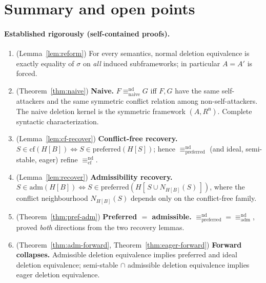 \documentclass{amsart}
\theoremstyle{remark}
\begin{document}
\section{Summary and open points}\label{sec:status}

\paragraph{Established rigorously (self-contained proofs).}
\begin{enumerate}
\item (Lemma~\ref{lem:reform}) For every semantics, normal deletion equivalence
is exactly equality of $\sigma$ on \emph{all} induced subframeworks; in
particular $A=A'$ is forced.
\item (Theorem~\ref{thm:naive}) \textbf{Naive.} $F\equiv^{\mathrm{nd}}_
{\mathrm{naive}}G$ iff $F,G$ have the same self-attackers and the same symmetric
conflict relation among non-self-attackers.  The naive deletion kernel is the
symmetric framework $(A,R^{\mathrm n})$.  Complete syntactic characterization.
\item (Lemma~\ref{lem:cf-recover}) \textbf{Conflict-free recovery.}
$S\in\mathrm{cf}(H[B])\iff S\in\mathrm{preferred}(H[S])$; hence
$\equiv^{\mathrm{nd}}_{\mathrm{preferred}}$ (and ideal, semi-stable, eager)
refine $\equiv^{\mathrm{nd}}_{\mathrm{cf}}$.
\item (Lemma~\ref{lem:recover}) \textbf{Admissibility recovery.}
$S\in\mathrm{adm}(H[B])\iff S\in\mathrm{preferred}(H[\,S\cup N_{H[B]}(S)\,])$,
where the conflict neighbourhood $N_{H[B]}(S)$ depends only on the conflict-free
family.
\item (Theorem~\ref{thm:pref-adm}) \textbf{Preferred $=$ admissible.}
$\equiv^{\mathrm{nd}}_{\mathrm{preferred}}=\equiv^{\mathrm{nd}}_{\mathrm{adm}}$,
proved \emph{both} directions from the two recovery lemmas.
\item (Theorem~\ref{thm:adm-forward}, Theorem~\ref{thm:eager-forward})
\textbf{Forward collapses.} Admissible deletion equivalence implies preferred and
ideal deletion equivalence; semi-stable $\cap$ admissible deletion equivalence
implies eager deletion equivalence.
\end{enumerate}
\end{document}
